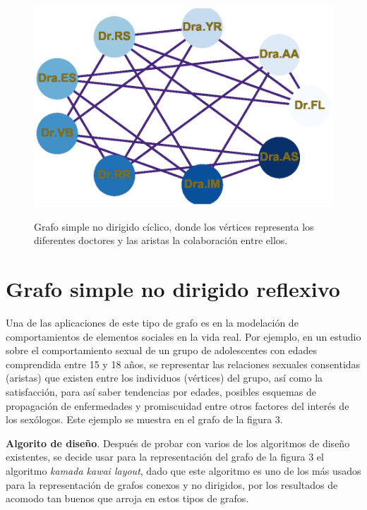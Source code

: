 \documentclass{article}
\begin{document}
    
\begin{center}

\end{center}
\begin{figure}[ht]
\begin{center}
\includegraphics[scale=0.7]{Graf2_circular_layout.eps}\\
\caption{Grafo simple no dirigido cíclico, donde los vértices representa los diferentes doctores y las aristas la colaboración entre ellos.}
\end{center}

\end{figure}

\newpage
\section{Grafo simple no dirigido reflexivo}
Una de las aplicaciones de este tipo de grafo es en la modelación de comportamientos de elementos sociales en la vida real.\linebreak
Por ejemplo, en un estudio sobre el comportamiento sexual de un grupo de adolescentes con edades comprendida entre 15 y 18 años, se representar las relaciones sexuales consentidas (aristas) que existen entre los individuos (vértices) del grupo, así como la satisfacción, para así saber tendencias por edades, posibles esquemas de propagación de enfermedades y promiscuidad entre otros factores del interés de los sexólogos. Este ejemplo se muestra en el grafo de la figura 3.\linebreak

\textbf{Algorito de diseño}.\linebreak
Después de probar con varios de los algoritmos de diseño existentes, se decide usar para la representación del grafo de la figura 3 el algoritmo \textit{kamada kawai layout}, dado que este algoritmo es uno de los más usados para la representación de grafos conexos y no dirigidos, por los resultados de acomodo tan buenos que arroja en estos tipos de grafos.
\end{document}
